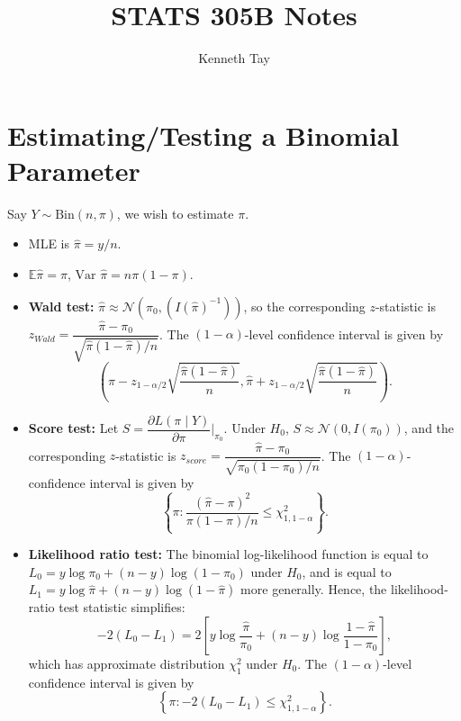 \documentclass[twoside]{article}
\newcommand\bbE{\mathbb{E}}
\newcommand\calN{\mathcal{N}}
\newcommand\var{\text{Var }}
\begin{document}
\title{STATS 305B Notes}
\author{Kenneth Tay}
\date{\vspace{-3ex}}
\maketitle

\tableofcontents

\section{Estimating/Testing a Binomial Parameter}
Say $Y \sim \text{Bin}(n, \pi)$, we wish to estimate $\pi$.
\begin{itemize}
\item MLE is $\hat{\pi} = y/n$.

\item $\bbE \hat{\pi} = \pi$, $\var \hat{\pi} = n\pi(1-\pi)$.

\item \textbf{Wald test:} $\hat{\pi} \approx \calN \left( \pi_0, (I(\hat{\pi})^{-1}) \right)$, so the corresponding $z$-statistic is $z_{Wald} = \dfrac{\hat{\pi} - \pi_0}{\sqrt{\hat{\pi}(1 - \hat{\pi}) / n}}$. The $(1-\alpha)$-level confidence interval is given by 
\begin{equation*} \left( \hat{\pi} - z_{1-\alpha/2} \sqrt{\frac{\hat{\pi}(1 - \hat{\pi})}{n}}, \hat{\pi} + z_{1-\alpha/2} \sqrt{\frac{\hat{\pi}(1 - \hat{\pi})}{n}} \right). \end{equation*}

\item \textbf{Score test:} Let $S = \dfrac{\partial L(\pi\mid Y)}{\partial \pi} \Bigg|_{\pi_0}$. Under $H_0$, $S \approx \calN(0, I(\pi_0))$, and the corresponding $z$-statistic is $z_{score} = \dfrac{\hat{\pi} - \pi_0}{\sqrt{\pi_0(1 - \pi_0) / n}}$. The $(1-\alpha)$-confidence interval is given by
\begin{equation*} \left\{ \pi: \frac{(\hat{\pi} - \pi)^2}{\pi(1 - \pi) / n} \leq \chi_{1, 1-\alpha}^2 \right\}.\end{equation*}

\item \textbf{Likelihood ratio test:} The binomial log-likelihood function is equal to $L_0 = y \log \pi_0 + (n-y) \log (1 - \pi_0)$ under $H_0$, and is equal to $L_1 = y \log \hat{\pi} + (n-y) \log (1 - \hat{\pi})$ more generally. Hence, the likelihood-ratio test statistic simplifies:
\begin{equation*} -2(L_0 - L_1) = 2 \left[ y \log \frac{\hat{\pi}}{\pi_0} + (n-y) \log \frac{1 - \hat{\pi}}{1 - \pi_0} \right], \end{equation*}
which has approximate distribution $\chi_1^2$ under $H_0$. The $(1-\alpha)$-level confidence interval is given by
\begin{equation*} \left\{ \pi: -2 (L_0 - L_1) \leq \chi_{1, 1-\alpha}^2 \right\}. \end{equation*}

\end{itemize}
\end{document}
